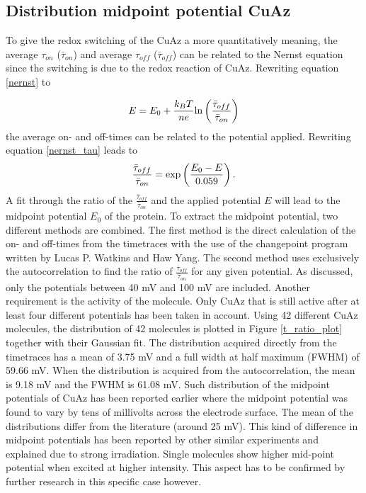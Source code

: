 \documentclass[twoside,single]{lion-msc}
\begin{document}
\subsection{Distribution midpoint potential CuAz}
To give the redox switching of the CuAz a more quantitatively meaning, the average $\tau_{on}$ ($\bar{\tau}_{on}$) and average $\tau_{off}$ ($\bar{\tau}_{off}$) can be related to the Nernst equation since the switching is due to the redox reaction of CuAz. Rewriting equation \ref{nernst} to 

\begin{equation}\label{nernst_tau}
E = E_{0}+\frac{k_{B}T}{ne}\textup{ln}\left ( \frac{\bar{\tau}_{off}}{\bar{\tau}_{on}} \right )
\end{equation}
the average on- and off-times can be related to the potential applied. Rewriting equation \ref{nernst_tau} leads to
\begin{equation}\label{fit_onoff}
\frac{\bar{\tau}_{off}}{\bar{\tau}_{on}} = \textup{exp}\left ( \frac{E_{0}-E}{0.059} \right ).
\end{equation}
A fit through the ratio of the $\frac{\bar{\tau}_{off}}{\bar{\tau}_{on}}$ and the applied potential $E$ will lead to the midpoint potential $E_{0}$ of the protein. To extract the midpoint potential, two different methods are combined. The first method is the direct calculation of the on- and off-times from the timetraces with the use of the changepoint program written by  Lucas P. Watkins and Haw Yang. The second method uses exclusively the autocorrelation to find the ratio of  $\frac{\bar{\tau}_{off}}{\bar{\tau}_{on}}$ for any given potential. As discussed, only the potentials between 40 mV and 100 mV are included. Another requirement is the activity of the molecule. Only CuAz that is still active after at least four different potentials has been taken in account. Using 42 different CuAz molecules, the distribution of 42 molecules is plotted in Figure \ref{t_ratio_plot} together with their Gaussian fit. The distribution acquired directly from the timetraces has a mean of 3.75 mV and a full width at half maximum (FWHM) of 59.66 mV. When the distribution is acquired from the autocorrelation, the mean is 9.18 mV and the FWHM is 61.08 mV. Such distribution of the midpoint potentials of CuAz has been reported earlier \cite{Salverda2010} where the midpoint potential was found to vary by tens of millivolts across the electrode surface. The mean of the distributions differ from the literature (around 25 mV). This kind of difference in midpoint potentials has been reported by other similar experiments \cite{Zhang2017} and explained due to strong irradiation. Single molecules show higher mid-point potential when excited at higher intensity. This aspect has to be confirmed by further research in this specific case however. 
\end{document}
